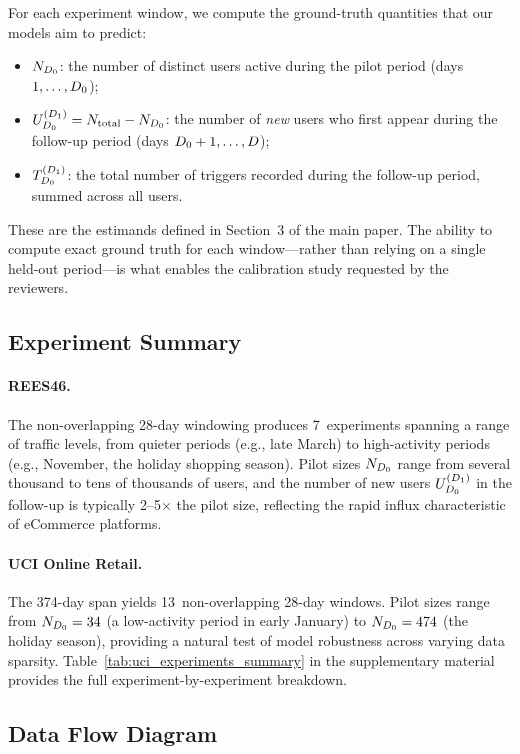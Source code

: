 For each experiment window, we compute the ground-truth quantities
that our models aim to predict:
\begin{itemize}[leftmargin=*]
  \item $N_{D_0}$: the number of distinct users active during the
        pilot period (days $1, \ldots, D_0$);
  \item $U_{D_0}^{(D_1)} = N_{\mathrm{total}} - N_{D_0}$: the number of
        \emph{new} users who first appear during the follow-up
        period (days $D_0 + 1, \ldots, D$);
  \item $T_{D_0}^{(D_1)}$: the total number of triggers recorded during
        the follow-up period, summed across all users.
\end{itemize}

These are the estimands defined in Section~3 of the main paper.
The ability to compute exact ground truth for each window---rather
than relying on a single held-out period---is what enables the
calibration study requested by the reviewers.

\subsection{Experiment Summary}

\paragraph{REES46.}
The non-overlapping 28-day windowing produces 7~experiments
spanning a range of traffic levels, from quieter periods
(e.g., late March) to high-activity periods (e.g., November,
the holiday shopping season).
Pilot sizes $N_{D_0}$ range from several thousand to tens of
thousands of users, and the number of new users $U_{D_0}^{(D_1)}$ in
the follow-up is typically 2--5$\times$ the pilot size,
reflecting the rapid influx characteristic of eCommerce platforms.

\paragraph{UCI Online Retail.}
The 374-day span yields 13~non-overlapping 28-day windows.
Pilot sizes range from $N_{D_0} = 34$ (a low-activity period
in early January) to $N_{D_0} = 474$ (the holiday season),
providing a natural test of model robustness across varying
data sparsity.
Table~\ref{tab:uci_experiments_summary} in the supplementary
material provides the full experiment-by-experiment breakdown.

\subsection{Data Flow Diagram}


